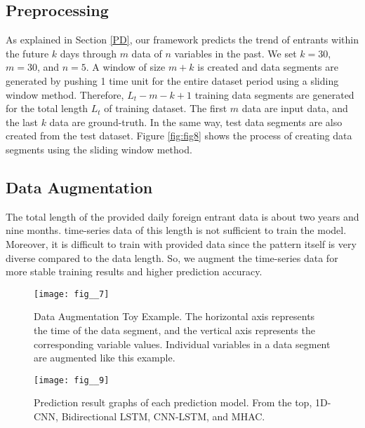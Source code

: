 \documentclass[conference]{IEEEtran}
\begin{document}
\subsection{Preprocessing}
As explained in Section \ref{PD}, our framework predicts the trend of entrants within the future \(k\) days through \(m\) data of \(n\) variables in the past. We set \(k = 30\), \(m = 30\), and \(n = 5\). A window of size \(m+k\) is created and data segments are generated by pushing 1 time unit for the entire dataset period using a sliding window method.  Therefore, \(L_t-m-k+1\) training data segments are generated for the total length \(L_t\) of training dataset. The first \(m\) data are input data, and the last \(k\) data are ground-truth. In the same way, test data segments are also created from the test dataset. Figure \ref{fig:fig8} shows the process of creating data segments using the sliding window method.

\subsection{Data Augmentation}

The total length of the provided daily foreign entrant data is about two years and nine months. time-series data of this length is not sufficient to train the model. Moreover, it is difficult to train with provided data since the pattern itself is very diverse compared to the data length. So, we augment the time-series data for more stable training results and higher prediction accuracy.

\begin{figure}[t]
\begin{center}
\texttt{[image: fig\_\_7]}
\end{center}
   \caption{Data Augmentation Toy Example. The horizontal axis represents the time of the data segment, and the vertical axis represents the corresponding variable values. Individual variables in a data segment are augmented like this example.}
\label{fig:fig7}
\end{figure}

\begin{figure*}
\begin{center}
\texttt{[image: fig\_\_9]}
\end{center}
   \caption{Prediction result graphs of each prediction model. From the top, 1D-CNN, Bidirectional LSTM, CNN-LSTM, and MHAC.}
\label{fig:fig9}
\end{figure*}
\end{document}
